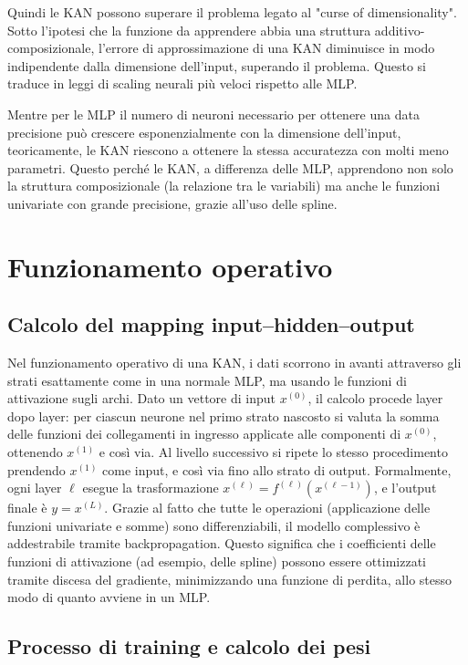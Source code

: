 \documentclass[a4paper,12pt]{report}
\begin{document}
	Quindi le KAN possono superare il problema legato al "curse of dimensionality". Sotto l'ipotesi che la funzione da apprendere abbia una struttura additivo-composizionale, l'errore di approssimazione di una KAN diminuisce in modo indipendente dalla dimensione dell'input, superando il problema. Questo si traduce in leggi di scaling neurali più veloci rispetto alle MLP.
	
	Mentre per le MLP il numero di neuroni necessario per ottenere una data precisione può crescere esponenzialmente con la dimensione dell'input, teoricamente, le KAN riescono a ottenere la stessa accuratezza con molti meno parametri. Questo perché le KAN, a differenza delle MLP, apprendono non solo la struttura composizionale (la relazione tra le variabili) ma anche le funzioni univariate con grande precisione, grazie all'uso delle spline.
	
	\section{Funzionamento operativo}
	
	\subsection{Calcolo del mapping input–hidden–output}
	
	Nel funzionamento operativo di una KAN, i dati scorrono in avanti attraverso gli strati esattamente come in una normale MLP, ma usando le funzioni di attivazione sugli archi. Dato un vettore di input $x^{(0)}$, il calcolo procede layer dopo layer: per ciascun neurone nel primo strato nascosto si valuta la somma delle funzioni dei collegamenti in ingresso applicate alle componenti di $x^{(0)}$, ottenendo $x^{(1)}$ e così via. Al livello successivo si ripete lo stesso procedimento prendendo $x^{(1)}$ come input, e così via fino allo strato di output. Formalmente, ogni layer $\ell$ esegue la trasformazione $x^{(\ell)} = f^{(\ell)}(x^{(\ell-1)})$, e l’output finale è $y = x^{(L)}$. Grazie al fatto che tutte le operazioni (applicazione delle funzioni univariate e somme) sono differenziabili, il modello complessivo è addestrabile tramite backpropagation. Questo significa che i coefficienti delle funzioni di attivazione (ad esempio, delle spline) possono essere ottimizzati tramite discesa del gradiente, minimizzando una funzione di perdita, allo stesso modo di quanto avviene in un MLP.
	
	\subsection{Processo di training e calcolo dei pesi}
	
\end{document}
